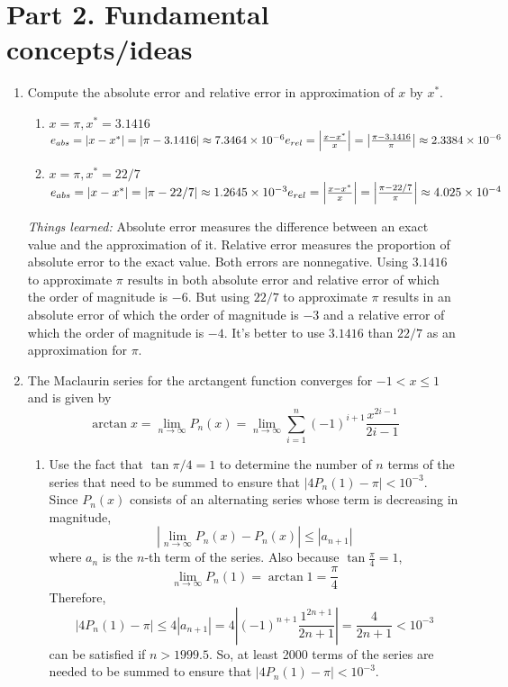 \documentclass[10pt]{report}
\newcommand{\abs}[1] {\left| #1 \right|}
\begin{document}
\section*{Part 2. Fundamental concepts/ideas}
\begin{enumerate}
	\item 
	Compute the absolute error and relative error in approximation of $x$ by $x^*$.
	\begin{enumerate}
		\item 
		\(
		x=\pi, x^*=3.1416
		\)
		\\
		\(
		e_{abs}
		= \abs{x - x^*}
		= \abs{\pi - 3.1416}
		\approx 7.3464\times 10^{-6}
		\\
		e_{rel}
		= \abs{\frac{x - x^*}{x}}
		= \abs{\frac{\pi - 3.1416}{\pi}}
		\approx 2.3384\times 10^{-6}
		\)
		
		\item 
		\(
		x=\pi, x^*=22/7
		\)
		\\
		\(
		e_{abs}
		= \abs{x - x^*}
		= \abs{\pi - 22/7}
		\approx 1.2645\times 10^{-3}
		\\
		e_{rel}
		= \abs{\frac{x - x^*}{x}}
		= \abs{\frac{\pi - 22/7}{\pi}}
		\approx 4.025\times 10^{-4}
		\)
	\end{enumerate}
	\textit{Things learned:} Absolute error measures the difference between an exact value and the approximation of it. Relative error measures the proportion of absolute error to the exact value. Both errors are nonnegative. Using $3.1416$ to approximate $\pi$ results in both absolute error and relative error of which the order of magnitude is $-6$. But using $22/7$ to approximate $\pi$ results in an absolute error of which the order of magnitude is $-3$ and a relative error of which the order of magnitude is $-4$. It's better to use $3.1416$ than $22/7$ as an approximation for $\pi$.
	
	\item
	The Maclaurin series for the arctangent function converges for $-1 < x \le 1$ and is given by
	\[
	\arctan{x} 
	= \lim\limits_{n\to \infty} P_n(x) 
	= \lim\limits_{n\to \infty} \sum_{i=1}^{n} (-1)^{i+1} \frac{x^{2i-1}}{2i-1}
	\]
	\begin{enumerate}
		\item 
		Use the fact that $\tan{\pi / 4} = 1$ to determine the number of $n$ terms of the series that need to be summed to ensure that $\abs{4P_n(1)-\pi}<10^{-3}$.
		\\
		Since $P_n(x)$ consists of an alternating series whose term is decreasing in magnitude, 
		\[
		\abs{\lim\limits_{n\to \infty} P_n(x) - P_n(x)} \le \abs{a_{n+1}}
		\]
		where $a_n$ is the $n$-th term of the series. Also because $\tan{\frac{\pi}{4}} = 1$,
		\[
		\lim\limits_{n\to \infty} P_n(1) = \arctan{1} = \frac{\pi}{4}
		\]
		Therefore,
		\[
		\abs{4P_n(1) - \pi} 
		\le 4\abs{a_{n+1}} 
		= 4\abs{(-1)^{n+1} \frac{1^{2n+1}}{2n+1}} 
		= \frac{4}{2n+1}
		< 10^{-3}
		\]
		can be satisfied if $n > 1999.5$. So, at least 2000 terms of the series are needed to be summed to ensure that $\abs{4P_n(1) - \pi} < 10^{-3}$.
		

\end{enumerate}
\end{enumerate}
\end{document}
